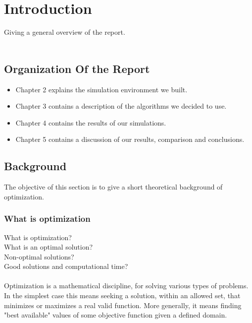 \chapter{Introduction}
Giving a general overview of the report.\\
\\



\section{Organization Of the Report}

\begin{itemize}
\item Chapter 2 explains the simulation environment we built.
\item Chapter 3 contains a description of the algorithms we decided to use.
\item Chapter 4 contains the results of our simulations.
\item Chapter 5 contains a discussion of our results, comparison and conclusions.
\end{itemize}




\section{Background}
The objective of this section is to give a short theoretical
background of optimization.
\subsection{What is optimization}
What is optimization?\\
What is an optimal solution?\\
Non-optimal solutions?\\
Good solutions and computational time?\\
\\
Optimization is a mathematical discipline, for solving various types of problems. In the simplest case this means seeking a solution, within an allowed set, that minimizes or maximizes a real valid function.
More generally, it means finding "best available" values of some objective function given a defined domain.\\




